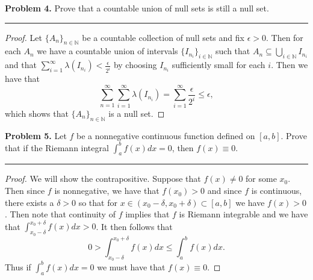 \documentclass[leqno]{article}
\theoremstyle{nonumberplain}
\newtheorem{proof}{Proof}
\newcommand{\N}{\mathbb{N}}
\begin{document}
\pagebreak




\noindent\textbf{Problem 4.} \quad
Prove that a countable union of null sets is still a null set.

\noindent\rule[0.5ex]{\linewidth}{1pt}

\begin{proof}
Let $\{A_n\}_{n\in \N}$ be a countable collection of null sets and fix $\epsilon>0$.  Then for each $A_n$ we have a countable union of intervals $\{I_{n_i}\}_{i\in \N}$ such that $A_n \subseteq \bigcup_{i\in \N} I_{n_i}$ and that $\sum_{i=1}^\infty \lambda\left( I_{n_i} \right) < \frac{\epsilon}{2^i}$ by choosing $I_{n_i}$ sufficiently small for each $i$. Then we have that
\[
\sum_{n=1}^\infty \sum_{i=1}^\infty \lambda \left( I_{n_i} \right) = \sum_{i=1}^\infty \frac{\epsilon}{2^i} \leq \epsilon,
\]
which shows that $\{A_n\}_{n\in \N}$ is a null set.
\end{proof}

\pagebreak



\noindent\textbf{Problem 5.} \quad
Let $f$ be a nonnegative continuous function defined on $[a,b]$. Prove that if the Riemann integral $\int_a^b f(x) dx =0$, then $f(x)\equiv 0$.  

\noindent\rule[0.5ex]{\linewidth}{1pt}

\begin{proof}
We will show the contrapositive.  Suppose that $f(x)\neq 0$ for some $x_0$.  Then since $f$ is nonnegative, we have that $f(x_0)>0$ and since $f$ is continuous, there exists a $\delta>0$ so that for $x \in (x_0-\delta,x_0+\delta)\subset [a,b]$ we have $f(x)>0$.  Then note that continuity of $f$ implies that $f$ is Riemann integrable and we have that $\int_{x_0-\delta}^{x_0+\delta} f(x)dx>0$.  It then follows that
\[
0>\int_{x_0-\delta}^{x_0+\delta} f(x)dx \leq \int_a^b f(x)dx.
\]
Thus if $\int_a^b f(x)dx=0$ we must have that $f(x)\equiv 0$.  
\end{proof}
\end{document}
